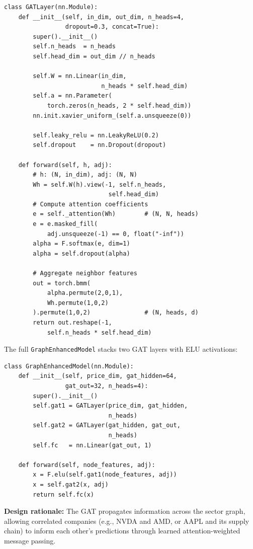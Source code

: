 \documentclass[12pt, a4paper]{article}
\begin{document}
\begin{lstlisting}[caption={Custom GAT layer}]
class GATLayer(nn.Module):
    def __init__(self, in_dim, out_dim, n_heads=4,
                 dropout=0.3, concat=True):
        super().__init__()
        self.n_heads  = n_heads
        self.head_dim = out_dim // n_heads
        
        self.W = nn.Linear(in_dim,
                           n_heads * self.head_dim)
        self.a = nn.Parameter(
            torch.zeros(n_heads, 2 * self.head_dim))
        nn.init.xavier_uniform_(self.a.unsqueeze(0))
        
        self.leaky_relu = nn.LeakyReLU(0.2)
        self.dropout    = nn.Dropout(dropout)
    
    def forward(self, h, adj):
        # h: (N, in_dim), adj: (N, N)
        Wh = self.W(h).view(-1, self.n_heads,
                             self.head_dim)
        # Compute attention coefficients
        e = self._attention(Wh)        # (N, N, heads)
        e = e.masked_fill(
            adj.unsqueeze(-1) == 0, float("-inf"))
        alpha = F.softmax(e, dim=1)
        alpha = self.dropout(alpha)
        
        # Aggregate neighbor features
        out = torch.bmm(
            alpha.permute(2,0,1),
            Wh.permute(1,0,2)
        ).permute(1,0,2)               # (N, heads, d)
        return out.reshape(-1,
            self.n_heads * self.head_dim)
\end{lstlisting}

The full \texttt{GraphEnhancedModel} stacks two GAT layers with ELU activations:

\begin{lstlisting}[caption={Graph-enhanced model}]
class GraphEnhancedModel(nn.Module):
    def __init__(self, price_dim, gat_hidden=64,
                 gat_out=32, n_heads=4):
        super().__init__()
        self.gat1 = GATLayer(price_dim, gat_hidden,
                             n_heads)
        self.gat2 = GATLayer(gat_hidden, gat_out,
                             n_heads)
        self.fc   = nn.Linear(gat_out, 1)
    
    def forward(self, node_features, adj):
        x = F.elu(self.gat1(node_features, adj))
        x = self.gat2(x, adj)
        return self.fc(x)
\end{lstlisting}

\textbf{Design rationale:}  The GAT propagates information across the sector graph, allowing correlated companies (e.g., NVDA and AMD, or AAPL and its supply chain) to inform each other's predictions through learned attention-weighted message passing.
\end{document}
